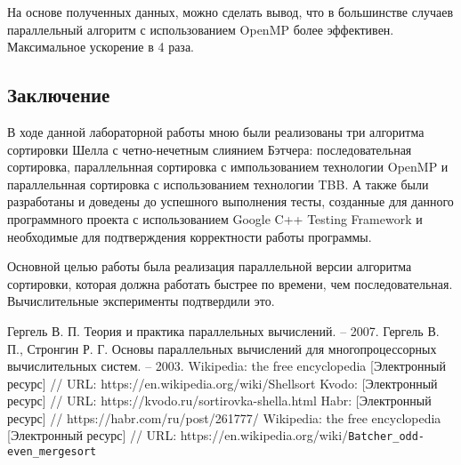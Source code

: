 \documentclass{report}
\begin{document}
\par На основе полученных данных, можно сделать вывод, что в большинстве случаев параллельный алгоритм с использованием OpenMP более эффективен. Максимальное ускорение в 4 раза.
\newpage

\begin{center}
\section*{Заключение}
\end{center}
\par В ходе данной лабораторной работы мною были реализованы три алгоритма сортировки Шелла с четно-нечетным слиянием Бэтчера: последовательная сортировка, параллельнная сортировка с импользованием технологии OpenMP и параллельнная сортировка с использованием технологии TBB. А также были разработаны и доведены до успешного выполнения тесты, созданные для данного программного проекта с использованием Google C++ Testing Framework и необходимые для подтверждения корректности работы программы.
\par Основной целью работы была реализация параллельной версии алгоритма сортировки, которая должна работать быстрее по времени, чем последовательная.
Вычислительные эксперименты подтвердили это.
\newpage

\begin{thebibliography}{}
 Гергель В. П. Теория и практика параллельных вычислений. – 2007.
 Гергель В. П., Стронгин Р. Г. Основы параллельных вычислений для многопроцессорных вычислительных систем. – 2003.
Wikipedia: the free encyclopedia [Электронный ресурс] // URL: https://en.wikipedia.org/wiki/Shellsort
Kvodo: [Электронный ресурс] // URL: https://kvodo.ru/sortirovka-shella.html 
Habr: [Электронный ресурс] // https://habr.com/ru/post/261777/
Wikipedia: the free encyclopedia [Электронный ресурс] // URL: https://en.wikipedia.org/wiki/\verb|Batcher_odd-even_mergesort|


\end{thebibliography}{}
\newpage
\end{document}
